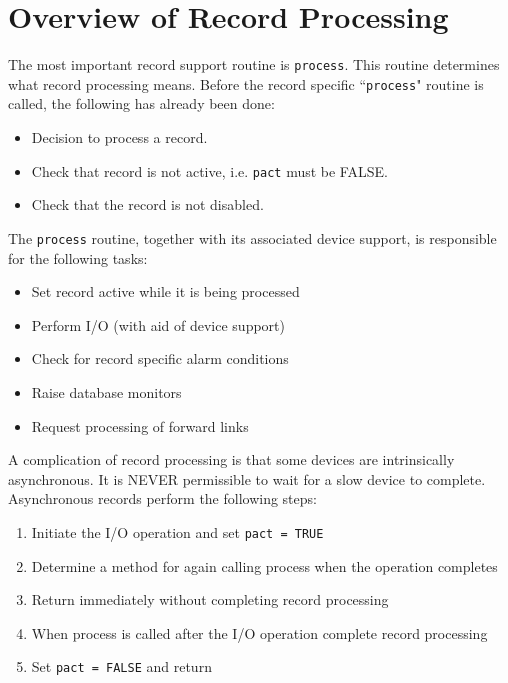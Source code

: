 \section{Overview of Record Processing}

The most important record support routine is \verb|process|.
This routine determines what record processing means.
Before the record specific ``\verb|process|" routine is called, the following has already been done:

\begin{itemize}
\item Decision to process a record.

\item Check that record is not active, i.e. \verb|pact| must be FALSE.

\item Check that the record is not disabled.

\end{itemize}

The \verb|process| routine, together with its associated device support, is responsible for the following tasks:

\begin{itemize}
\item Set record active while it is being processed

\item Perform I/O (with aid of device support)

\item Check for record specific alarm conditions

\item Raise database monitors

\item Request processing of forward links

\end{itemize}

A complication of record processing is that some devices are intrinsically asynchronous.
It is NEVER permissible to wait for a slow device to complete.
Asynchronous records perform the following steps:

\begin{enumerate}
\item Initiate the I/O operation and set \verb|pact = TRUE|

\item Determine a method for again calling process when the operation completes

\item Return immediately without completing record processing

\item When process is called after the I/O operation complete record processing

\item Set \verb|pact = FALSE| and return

\end{enumerate}

